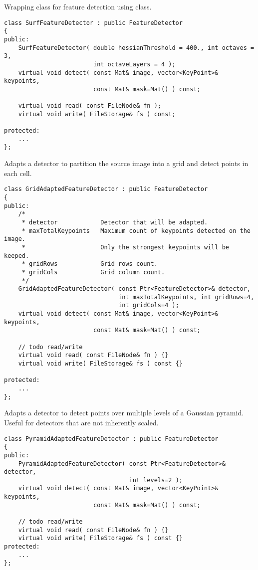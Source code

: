 Wrapping class for feature detection using  class.

\begin{lstlisting}
class SurfFeatureDetector : public FeatureDetector
{
public:
    SurfFeatureDetector( double hessianThreshold = 400., int octaves = 3,
                         int octaveLayers = 4 );
    virtual void detect( const Mat& image, vector<KeyPoint>& keypoints, 
                         const Mat& mask=Mat() ) const;
                         
    virtual void read( const FileNode& fn );
    virtual void write( FileStorage& fs ) const;

protected:
	...
};
\end{lstlisting}

Adapts a detector to partition the source image into a grid and detect 
points in each cell.

\begin{lstlisting}
class GridAdaptedFeatureDetector : public FeatureDetector
{
public:
    /*
     * detector            Detector that will be adapted.
     * maxTotalKeypoints   Maximum count of keypoints detected on the image. 
     *                     Only the strongest keypoints will be keeped.
     * gridRows            Grid rows count.
     * gridCols            Grid column count.
     */
    GridAdaptedFeatureDetector( const Ptr<FeatureDetector>& detector, 
                                int maxTotalKeypoints, int gridRows=4, 
                                int gridCols=4 );
    virtual void detect( const Mat& image, vector<KeyPoint>& keypoints, 
                         const Mat& mask=Mat() ) const;

    // todo read/write
    virtual void read( const FileNode& fn ) {}
    virtual void write( FileStorage& fs ) const {}

protected:
    ...
};
\end{lstlisting}

Adapts a detector to detect points over multiple levels of a Gaussian
pyramid. Useful for detectors that are not inherently scaled.

\begin{lstlisting}
class PyramidAdaptedFeatureDetector : public FeatureDetector
{
public:
    PyramidAdaptedFeatureDetector( const Ptr<FeatureDetector>& detector, 
                                   int levels=2 );
    virtual void detect( const Mat& image, vector<KeyPoint>& keypoints, 
                         const Mat& mask=Mat() ) const;

    // todo read/write
    virtual void read( const FileNode& fn ) {}
    virtual void write( FileStorage& fs ) const {}
protected:
    ...
};
\end{lstlisting}

